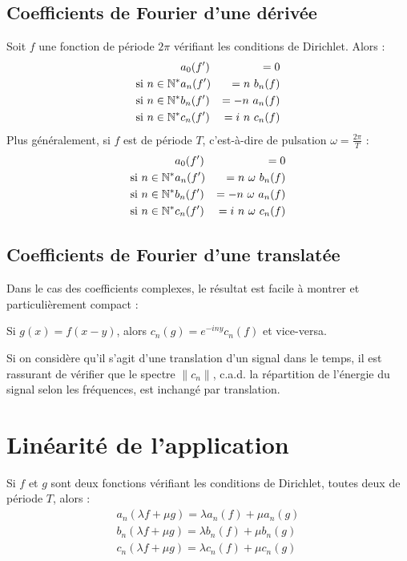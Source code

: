 \subsection{Coefficients de Fourier d'une dérivée}
Soit $f$ une fonction de période $2\pi$ vérifiant les conditions de Dirichlet.
Alors : 
\begin{eqnarray}
& a_0(f')&=0 \label{eqderivee}\\
\text{si~} n\in \mathbb{N}^* & a_n(f')&=n~b_n(f) \\
\text{si~} n\in \mathbb{N}^* & b_n(f')&=-n~a_n(f) \\
\text{si~} n\in \mathbb{N}^* & c_n(f')&=i~n~c_n(f)
\end{eqnarray}
Plus généralement, si $f$ est de période $T$, c'est-à-dire de
pulsation $\omega=\frac{2\pi}{T}$ :
\begin{eqnarray}
& a_0(f')&=0 \\
\text{si~}n\in \mathbb{N}^* & a_n(f')&=n~\omega~b_n(f) \\
\text{si~}n\in \mathbb{N}^* & b_n(f')&=-n~\omega~a_n(f) \\
\text{si~}n\in \mathbb{N}^* & c_n(f')&=i~n~\omega~c_n(f)
\end{eqnarray}

\subsection{Coefficients de Fourier d'une translatée}

Dans le cas des coefficients complexes, le résultat est facile à
montrer et particulièrement compact :

Si $g(x)=f(x-y)$, alors $c_n(g)=e^{-iny}c_n(f)$ et vice-versa.

Si on considère qu'il s'agit d'une translation d'un signal dans le temps, il est rassurant de vérifier que le spectre $\|c_n\|$, c.a.d. la répartition de l'énergie du signal selon les fréquences, est inchangé par translation. 


\section{Linéarité de l'application}

Si $f$ et $g$ sont deux fonctions vérifiant les conditions de
Dirichlet, toutes deux de période $T$, alors :
\begin{eqnarray}
a_n(\lambda f+\mu g)=\lambda a_n(f)  + \mu a_n (g) \\
b_n(\lambda f+\mu g)=\lambda b_n(f)  + \mu b_n (g) \\
c_n(\lambda f+\mu g)=\lambda c_n(f)  + \mu c_n (g)
\end{eqnarray}

